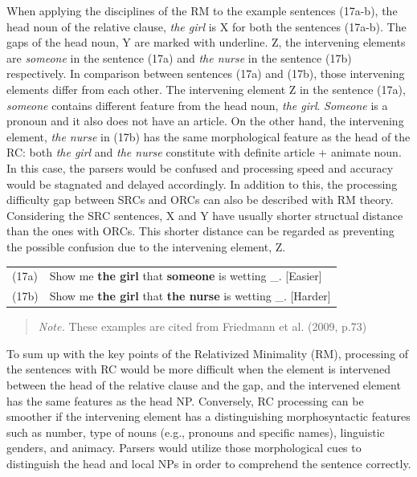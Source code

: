\documentclass[
]{article}
\begin{document}
When applying the disciplines of the RM to the example sentences
(17a-b), the head noun of the relative clause, \emph{the girl} is X for
both the sentences (17a-b). The gaps of the head noun, Y are marked with
underline. Z, the intervening elements are \emph{someone} in the
sentence (17a) and \emph{the nurse} in the sentence (17b) respectively.
In comparison between sentences (17a) and (17b), those intervening
elements differ from each other. The intervening element Z in the
sentence (17a), \emph{someone} contains different feature from the head
noun, \emph{the girl}. \emph{Someone} is a pronoun and it also does not
have an article. On the other hand, the intervening element, \emph{the
nurse} in (17b) has the same morphological feature as the head of the
RC: both \emph{the girl} and \emph{the nurse} constitute with definite
article + animate noun. In this case, the parsers would be confused and
processing speed and accuracy would be stagnated and delayed
accordingly. In addition to this, the processing difficulty gap between
SRCs and ORCs can also be described with RM theory. Considering the SRC
sentences, X and Y have usually shorter structual distance than the ones
with ORCs. This shorter distance can be regarded as preventing the
possible confusion due to the intervening element, Z.

\vspace{1em}

\noindent
\begin{tabularx}{\linewidth}{@{}lX@{}}
(17a) & Show me \textbf{the girl} that \textbf{someone} is wetting \_. \hfill [Easier] \\
(17b) & Show me \textbf{the girl} that \textbf{the nurse} is wetting \_. \hfill [Harder] \\
\end{tabularx}

\vspace{1em}

\noindent
\begin{quote}
\small
\textit{Note.} These examples are cited from Friedmann et al. (2009, p.73)
\end{quote}

\vspace{1em}

To sum up with the key points of the Relativized Minimality (RM),
processing of the sentences with RC would be more difficult when the
element is intervened between the head of the relative clause and the
gap, and the intervened element has the same features as the head NP.
Conversely, RC processing can be smoother if the intervening element has
a distinguishing morphosyntactic features such as number, type of nouns
(e.g., pronouns and specific names), linguistic genders, and animacy.
Parsers would utilize those morphological cues to distinguish the head
and local NPs in order to comprehend the sentence correctly.
\end{document}
